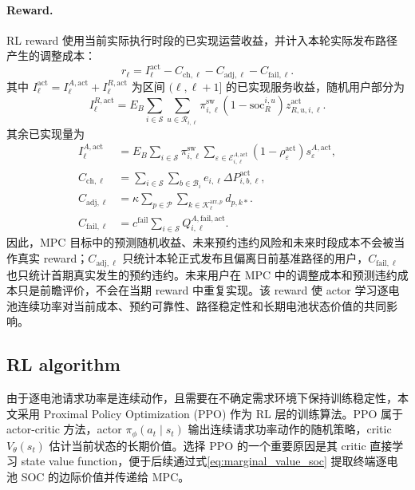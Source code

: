 \documentclass[12pt,a4paper,UTF8]{ctexart}
\begin{document}
\paragraph{Reward.}
RL reward 使用当前实际执行时段的已实现运营收益，并计入本轮实际发布路径产生的调整成本：
\begin{equation}
r_\ell
=
I_\ell^{\mathrm{act}}
-C_{\mathrm{ch},\ell}
-C_{\mathrm{adj},\ell}
-C_{\mathrm{fail},\ell}.
\label{eq:rl_reward}
\end{equation}
其中 $I_\ell^{\mathrm{act}}=I_\ell^{A,\mathrm{act}}+I_\ell^{R,\mathrm{act}}$ 为区间 $(\ell,\ell+1]$ 的已实现服务收益，随机用户部分为
\begin{equation}
I_\ell^{R,\mathrm{act}}
=E_B\sum_{i\in\mathcal S}
\sum_{u\in\mathcal R_{i,\ell}}
\pi_{i,\ell}^{\mathrm{sw}}
(1-\mathrm{soc}_R^{i,u})z_{R,u,i,\ell}^{\mathrm{act}}.
\label{eq:realized_random_income}
\end{equation}
其余已实现量为
\begin{align}
I_\ell^{A,\mathrm{act}}
&=E_B\sum_{i\in\mathcal S}\pi_{i,\ell}^{\mathrm{sw}}
\sum_{\varepsilon\in\mathcal E_{i,\ell}^{A,\mathrm{act}}}
(1-\rho_\varepsilon^{\mathrm{act}})s_\varepsilon^{A,\mathrm{act}},
\label{eq:realized_reservation_income}\\
C_{\mathrm{ch},\ell}
&=\sum_{i\in\mathcal S}\sum_{b\in\mathcal B_i}
e_{i,\ell}\Delta P_{i,b,\ell}^{\mathrm{act}},
\label{eq:realized_charging_cost}\\
C_{\mathrm{adj},\ell}
&=\kappa\sum_{p\in\mathcal P}
\sum_{k\in\mathcal K_\ell^{\mathrm{arr},p}}d_{p,k*}.
\label{eq:realized_adjustment_cost}\\
C_{\mathrm{fail},\ell}
&=c^{\mathrm{fail}}\sum_{i\in\mathcal S}
Q_{i,\ell}^{A,\mathrm{fail,act}}.
\label{eq:realized_reservation_failure_cost}
\end{align}
因此，MPC 目标中的预测随机收益、未来预约违约风险和未来时段成本不会被当作真实 reward；$C_{\mathrm{adj},\ell}$ 只统计本轮正式发布且偏离日前基准路径的用户，$C_{\mathrm{fail},\ell}$ 也只统计首期真实发生的预约违约。未来用户在 MPC 中的调整成本和预测违约成本只是前瞻评价，不会在当期 reward 中重复实现。该 reward 使 actor 学习逐电池连续功率对当前成本、预约可靠性、路径稳定性和长期电池状态价值的共同影响。


\subsection{RL algorithm}

由于逐电池请求功率是连续动作，且需要在不确定需求环境下保持训练稳定性，本文采用 Proximal Policy Optimization (PPO) 作为 RL 层的训练算法。PPO 属于 actor-critic 方法，actor $\pi_{\phi}(a_t\mid s_t)$ 输出连续请求功率动作的随机策略，critic $V_{\theta}(s_t)$ 估计当前状态的长期价值。选择 PPO 的一个重要原因是其 critic 直接学习 state value function，便于后续通过式\eqref{eq:marginal_value_soc} 提取终端逐电池 SOC 的边际价值并传递给 MPC。
\end{document}
